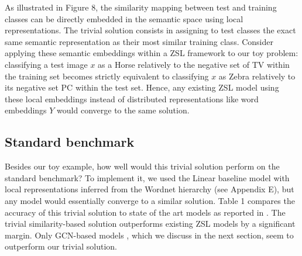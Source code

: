 
As illustrated in Figure 8, the similarity mapping between test and training classes can be directly embedded in the semantic space using local representations.
The trivial solution consists in assigning to test classes the exact same semantic representation as their most similar training class. 
Consider applying these semantic embeddings within a ZSL framework to our toy problem:
classifying a test image $x$ as a Horse relatively to the negative set of TV within the training set 
becomes strictly equivalent to classifying $x$ as Zebra relatively to its negative set PC within the test set.
Hence, any existing ZSL model using these local embeddings instead of distributed representations like word embeddings $Y$ would converge to the same solution.

\subsection{Standard benchmark}

Besides our toy example, how well would this trivial solution perform on the standard benchmark?
To implement it, we used the Linear baseline model \cite{romera2015embarrassingly} 
with local representations inferred from the Wordnet hierarchy (see Appendix E), 
but any model would essentially converge to a similar solution.
Table 1 compares the accuracy of this trivial solution to state of the art models as reported in \cite{xian2017zero,kampffmeyer2018rethinking}. %
The trivial similarity-based solution outperforms existing ZSL models by a significant margin.
Only GCN-based models \cite{kampffmeyer2018rethinking}, 
which we discuss in the next section, 
seem to outperform our trivial solution.

